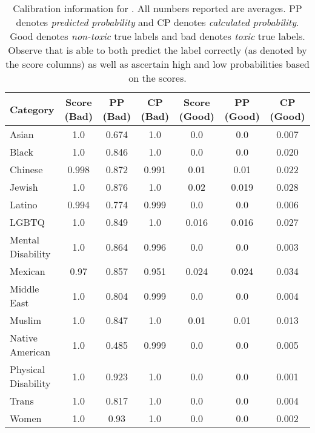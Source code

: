 \begin{table}
\footnotesize
\centering
\begin{tabular}{@{}lcccccc@{}}
\toprule
{\bf Category} & {\bf Score (Bad)} & {\bf PP (Bad)} & {\bf CP (Bad)} & {\bf Score (Good)} & {\bf PP (Good)} & {\bf CP (Good)}\\
\midrule \midrule
Asian & 1.0 & 0.674 & 1.0 & 0.0 & 0.0 & 0.007 \\
Black & 1.0 & 0.846 & 1.0 & 0.0 & 0.0 & 0.020 \\
Chinese & 0.998 & 0.872 & 0.991 & 0.01 & 0.01 & 0.022 \\
Jewish & 1.0 & 0.876 & 1.0 & 0.02 & 0.019 & 0.028 \\
Latino & 0.994 & 0.774 & 0.999 & 0.0 & 0.0 & 0.006 \\
LGBTQ & 1.0 & 0.849 & 1.0 & 0.016 & 0.016 & 0.027 \\
Mental Disability & 1.0 & 0.864 & 0.996 & 0.0 & 0.0 & 0.003 \\
Mexican & 0.97 & 0.857 & 0.951 & 0.024 & 0.024 & 0.034 \\
Middle East & 1.0 & 0.804 & 0.999 & 0.0 & 0.0 & 0.004 \\
Muslim & 1.0 & 0.847 & 1.0 & 0.01 & 0.01 & 0.013 \\
Native American & 1.0 & 0.485 & 0.999 & 0.0 & 0.0 & 0.005 \\
Physical Disability & 1.0 & 0.923 & 1.0 & 0.0 & 0.0 & 0.001 \\
Trans & 1.0 & 0.817 & 1.0 & 0.0 & 0.0 & 0.004 \\
Women & 1.0 & 0.93 & 1.0 & 0.0 & 0.0 & 0.002 \\
\bottomrule
\end{tabular}
\caption{Calibration information for \DV. All numbers reported are averages. PP denotes {\em predicted probability} and CP denotes {\em calculated probability}. Good denotes {\em non-toxic} true labels and bad denotes {\em toxic} true labels. Observe that \DV is able to both predict the label correctly (as denoted by the score columns) as well as ascertain high and low probabilities based on the scores.}
\end{table}
\fi